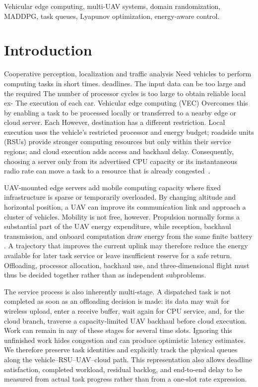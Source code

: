 \documentclass[journal]{IEEEtran}
\begin{document}
\begin{IEEEkeywords}
Vehicular edge computing, multi-UAV systems, domain randomization, MADDPG,
task queues, Lyapunov optimization, energy-aware control.
\end{IEEEkeywords}

\section{Introduction}
Cooperative perception, localization and traffic analysis Need vehicles to perform computing tasks in short times.
deadlines. The input data can be too large and the required The number of processor cycles is too large to obtain reliable local ex-
The execution of each car. Vehicular edge computing (VEC)
Overcomes this by enabling a task to be processed
locally or transferred to a nearby edge or cloud server. Each
However, destination has a different restriction. Local execution uses the vehicle's restricted processor
and energy budget; roadside units (RSUs) provide stronger computing resources
but only within their service regions; and cloud execution adds access and
backhaul delay. Consequently, choosing a server only from its advertised CPU
capacity or its instantaneous radio rate can move a task to a resource that is
already congested~\cite{liu2020uav,liang2025rav}.

UAV-mounted edge servers add mobile computing capacity where fixed
infrastructure is sparse or temporarily overloaded. By changing altitude and
horizontal position, a UAV can improve its communication link and approach a
cluster of vehicles. Mobility is not free, however. Propulsion normally forms
a substantial part of the UAV energy expenditure, while reception, backhaul
transmission, and onboard computation draw energy from the same finite battery
\cite{liu2020uav,talukdar2026mappo}. A trajectory that improves the current
uplink may therefore reduce the energy available for later task service or
leave insufficient reserve for a safe return. Offloading, processor
allocation, backhaul use, and three-dimensional flight must thus be decided
together rather than as independent subproblems.

The service process is also inherently multi-stage. A dispatched task is not
completed as soon as an offloading decision is made: its data may wait for
wireless upload, enter a receive buffer, wait again for CPU service, and, for
the cloud branch, traverse a capacity-limited UAV backhaul before cloud
execution. Work can remain in any of these stages for several time slots.
Ignoring this unfinished work hides congestion and can produce optimistic
latency estimates. We therefore preserve task identities and explicitly track
the physical queues along the vehicle--RSU--UAV--cloud path. This representation
also allows deadline satisfaction, completed workload, residual backlog, and
end-to-end delay to be measured from actual task progress rather than from a
one-slot rate expression.
\end{document}
